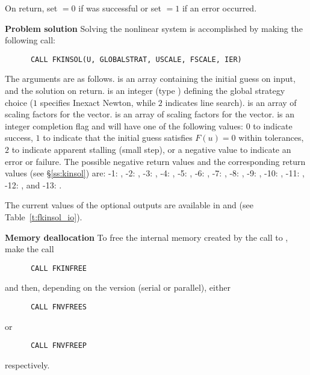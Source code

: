 \begin{Steps}
  On return, set  $= 0$ if  was successful or set  $= 1$
  if an error occurred.
  
\item {\bf Problem solution}
  Solving the nonlinear system is accomplished by making the following call:
\begin{verbatim}
      CALL FKINSOL(U, GLOBALSTRAT, USCALE, FSCALE, IER)
\end{verbatim}
  The arguments are as follows.
   is an array containing the initial guess on input, and the
  solution on return.
   is an integer (type ) defining the global strategy 
  choice ($1$ specifies Inexact Newton, while $2$ indicates line search).
   is an array of scaling factors for the  vector.
   is an array of scaling factors for the  vector.
   is an integer completion flag and will have one of the following values:
  $0$ to indicate success,
  $1$ to indicate that the initial guess satisfies $F(u) = 0$ within tolerances,
  $2$ to indicate apparent stalling (small step), or a negative value to indicate
  an error or failure.  The possible negative return values and the
  corresponding  return values (see \S\ref{ss:kinsol}) are:
  -1: , -2: , -3: ,
  -4: , -5: ,
  -6: , -7: ,
  -8: , -9: ,
  -10: , -11: ,
  -12: , and -13: .
  
  The current values of the optional outputs are available in  and
   (see Table~\ref{t:fkinsol_io}).
  
\item {\bf Memory deallocation}
  To free the internal memory created by the call to ,
  make the call
\begin{verbatim}
      CALL FKINFREE
\end{verbatim}
  and then, depending on the {\nvector} version (serial or parallel), either
\begin{verbatim}
      CALL FNVFREES
\end{verbatim}
  or
\begin{verbatim}
      CALL FNVFREEP  
\end{verbatim}
  respectively.
  
\end{Steps}


